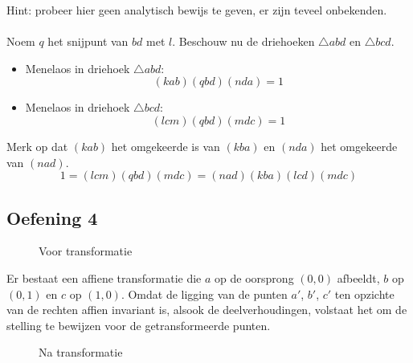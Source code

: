 \documentclass[main.tex]{subfiles}
\begin{document}
Hint: probeer hier geen analytisch bewijs te geven, er zijn teveel onbekenden.\\\\
Noem $q$ het snijpunt van $bd$ met $l$.
Beschouw nu de driehoeken $\triangle abd$ en $\triangle bcd$.
\begin{itemize}
\item Menelaos in driehoek $\triangle abd$:
  \[ (kab)(qbd)(nda) = 1 \]
\item Menelaos in driehoek $\triangle bcd$:
  \[ (lcm)(qbd)(mdc) = 1 \]
\end{itemize}
Merk op dat $(kab)$ het omgekeerde is van $(kba)$ en $(nda)$ het omgekeerde van $(nad)$.
\[ 1 = (lcm)(qbd)(mdc) = (nad)(kba)(lcd)(mdc) \]

\subsection{Oefening 4}
\begin{figure}[H]
  \centering
  \caption{Voor transformatie}
\end{figure}
Er bestaat een affiene transformatie die $a$ op de oorsprong $(0,0)$ afbeeldt, $b$ op $(0,1)$ en $c$ op $(1,0)$.
Omdat de ligging van de punten $a'$, $b'$, $c'$ ten opzichte van de rechten affien invariant is, alsook de deelverhoudingen, volstaat het om de stelling te bewijzen voor de getransformeerde punten.
\begin{figure}[H]
  \centering
  \caption{Na transformatie}
\end{figure}
\end{document}
